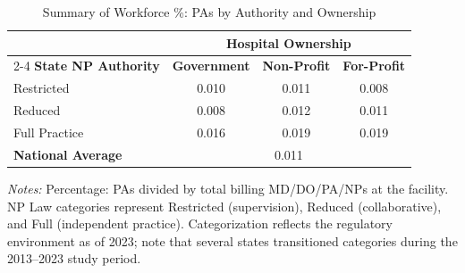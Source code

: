 \begin{table}[htbp]
    \centering
    \caption{Summary of Workforce \%: PAs by Authority and Ownership}
    \label{tab:pct_pa}
    \vspace{0.2cm}
    \begin{tabular}{lccc}
        \toprule
        & \multicolumn{3}{c}{\textbf{Hospital Ownership}} \\
        \cmidrule(lr){2-4}
        \textbf{State NP Authority} & \textbf{Government} & \textbf{Non-Profit} & \textbf{For-Profit} \\
        \midrule
        Restricted & 0.010 & 0.011 & 0.008 \\
        Reduced & 0.008 & 0.012 & 0.011 \\
        Full Practice & 0.016 & 0.019 & 0.019 \\
        \midrule
        \textbf{National Average} & \multicolumn{3}{c}{0.011} \\
        \bottomrule
    \end{tabular}
    \vspace{0.1cm}
    \begin{minipage}{0.85\textwidth}
        \footnotesize \textit{Notes:} Percentage: PAs divided by total billing MD/DO/PA/NPs at the facility. NP Law categories represent Restricted (supervision), Reduced (collaborative), and Full (independent practice). Categorization reflects the regulatory environment as of 2023; note that several states transitioned categories during the 2013--2023 study period.
    \end{minipage}
\end{table}